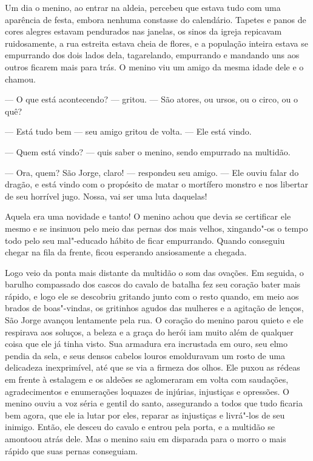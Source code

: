 Um dia o menino, ao entrar na aldeia, percebeu que estava tudo com uma
aparência de festa, embora nenhuma constasse do calendário. Tapetes e
panos de cores alegres estavam pendurados nas janelas, os sinos da
igreja repicavam ruidosamente, a rua estreita estava cheia de flores,
e a população inteira estava se empurrando dos dois lados dela,
tagarelando, empurrando e mandando uns aos outros ficarem mais para
trás. O menino viu um amigo da mesma idade dele e o chamou. 

--- O que está acontecendo? --- gritou. --- São atores, ou ursos, ou o
circo, ou o quê?

--- Está tudo bem --- seu amigo gritou de volta. --- Ele está vindo.

--- Quem está vindo? --- quis saber o menino, sendo empurrado na multidão.

--- Ora, quem? São Jorge, claro! --- respondeu seu amigo. --- Ele ouviu falar
do dragão, e está vindo com o propósito de matar o mortífero monstro
e nos libertar de seu horrível jugo. Nossa, vai ser uma luta daquelas!

Aquela era uma novidade e tanto! O menino achou que devia se
certificar ele mesmo e se insinuou pelo meio das pernas dos mais
velhos, xingando"-os o tempo todo pelo seu mal"-educado hábito de ficar
empurrando. Quando conseguiu chegar na fila da frente, ficou
esperando ansiosamente a chegada.

Logo veio da ponta mais distante da multidão o som das ovações. Em
seguida, o barulho compassado dos cascos do cavalo de batalha fez seu
coração bater mais rápido, e logo ele se descobriu gritando junto com
o resto quando, em meio aos brados de boas"-vindas, os gritinhos
agudos das mulheres e a agitação de lenços,
São Jorge avançou lentamente pela rua. O coração do menino parou
quieto e ele respirava aos soluços, a beleza e a graça do herói iam
muito além de qualquer coisa que ele já tinha visto. Sua armadura era
incrustada em ouro, seu elmo pendia da sela, e seus densos cabelos
louros emolduravam um rosto de uma delicadeza inexprimível, até que
se via a firmeza dos olhos. Ele puxou as rédeas em frente à estalagem
e os aldeões se aglomeraram em volta com saudações, agradecimentos e
enumerações loquazes de injúrias, injustiças e opressões. O menino
ouviu a voz séria e gentil do santo, assegurando a todos que tudo
ficaria bem agora, que ele ia lutar por eles, reparar as injustiças
e livrá"-los de seu inimigo. Então, ele desceu do cavalo e entrou pela
porta, e a multidão se amontoou atrás dele. Mas o menino saiu em
disparada para o morro o mais rápido que suas pernas conseguiam.

